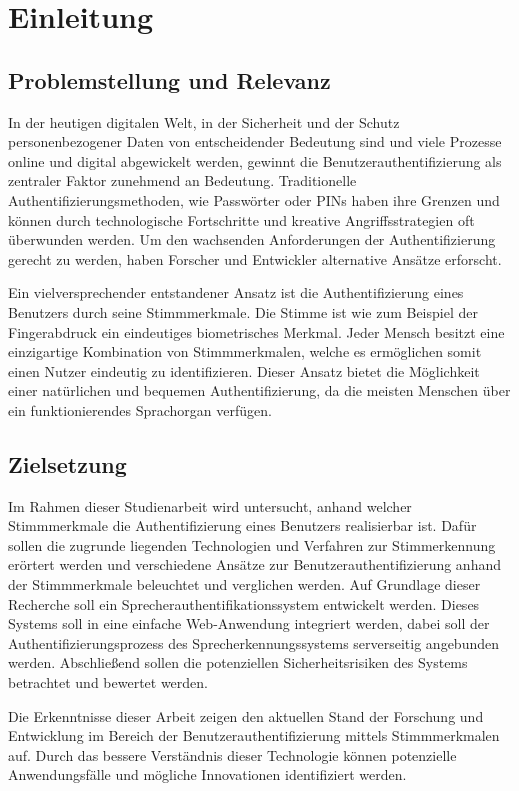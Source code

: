 \section{Einleitung}
\subsection{Problemstellung und Relevanz}
In der heutigen digitalen Welt, in der Sicherheit und der Schutz personenbezogener Daten von entscheidender Bedeutung sind und viele Prozesse online und digital abgewickelt werden, gewinnt die Benutzerauthentifizierung als zentraler Faktor zunehmend an Bedeutung.
Traditionelle Authentifizierungsmethoden, wie Passwörter oder PINs haben ihre Grenzen und können durch technologische Fortschritte und kreative Angriffsstrategien oft überwunden werden.
Um den wachsenden Anforderungen der Authentifizierung gerecht zu werden, haben Forscher und Entwickler alternative Ansätze erforscht.

Ein vielversprechender entstandener Ansatz ist die Authentifizierung eines Benutzers durch seine Stimmmerkmale.
Die Stimme ist wie zum Beispiel der Fingerabdruck ein eindeutiges biometrisches Merkmal.
Jeder Mensch besitzt eine einzigartige Kombination von Stimmmerkmalen, welche es ermöglichen somit einen Nutzer eindeutig zu identifizieren.
Dieser Ansatz bietet die Möglichkeit einer natürlichen und bequemen Authentifizierung, da die meisten Menschen über ein funktionierendes Sprachorgan verfügen.

\subsection{Zielsetzung}
Im Rahmen dieser Studienarbeit wird untersucht, anhand welcher Stimmmerkmale die Authentifizierung eines Benutzers realisierbar ist.
Dafür sollen die zugrunde liegenden Technologien und Verfahren zur Stimmerkennung erörtert werden und verschiedene Ansätze zur Benutzerauthentifizierung anhand der Stimmmerkmale beleuchtet und verglichen werden.
Auf Grundlage dieser Recherche soll ein Sprecherauthentifikationssystem entwickelt werden.
Dieses Systems soll in eine einfache Web-Anwendung integriert werden, dabei soll der Authentifizierungsprozess des Sprecherkennungssystems serverseitig angebunden werden.
Abschließend sollen die potenziellen Sicherheitsrisiken des Systems betrachtet und bewertet werden.

Die Erkenntnisse dieser Arbeit zeigen den aktuellen Stand der Forschung und Entwicklung im Bereich der Benutzerauthentifizierung mittels Stimmmerkmalen auf.
Durch das bessere Verständnis dieser Technologie können potenzielle Anwendungsfälle und mögliche Innovationen identifiziert werden.

